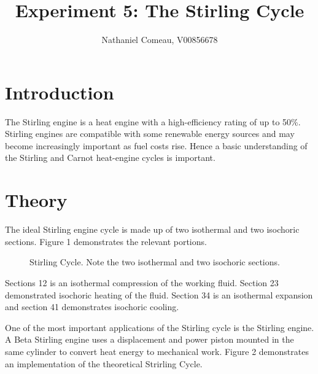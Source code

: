 \documentclass[9pt,twocolumn,twoside]{osajnl}
\title{Experiment 5: The Stirling Cycle}
\author[1]{Nathaniel Comeau, V00856678}
\affil[1]{Physics Department, University of Victoria}
\begin{document}
\maketitle

\section{Introduction}
The Stirling engine is a heat engine with a high-efficiency rating of up to 50\%\cite{stirling50}. Stirling engines are compatible with some renewable energy sources and may become increasingly important as fuel costs rise\cite{stirlingwiki}. Hence a basic understanding of the Stirling and Carnot heat-engine cycles is important.

\section{Theory}
\label{sec:theory}

The ideal Stirling engine cycle is made up of two isothermal and two isochoric sections. Figure 1 demonstrates the relevant portions\cite{stirlingdiagram}.%

\begin{figure}[htbp]
\centering
{}
\caption{Stirling Cycle. Note the two isothermal and two isochoric sections.}
\label{fig:stirlingcycle}
\end{figure}
Sections 12 is an isothermal compression of the working fluid. Section 23 demonstrated isochoric heating of the fluid. Section 34 is an isothermal expansion and section 41 demonstrates isochoric cooling.

One of the most important applications of the Stirling cycle is the Stirling engine.\cite{labmanual} A Beta Stirling engine uses a displacement and power piston mounted in the same cylinder to convert heat energy to mechanical work.\cite{stirlingwiki} Figure 2 demonstrates an implementation of the theoretical Strirling Cycle.
\end{document}
